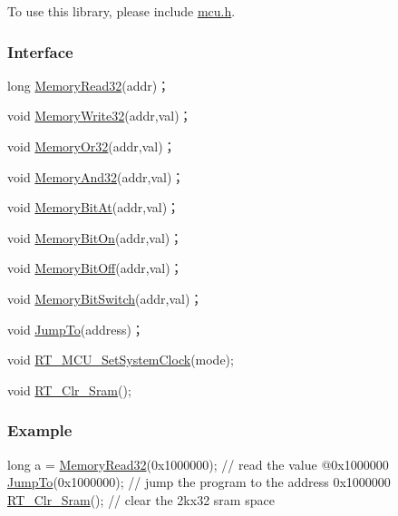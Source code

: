 To use this library, please include {\ttfamily \mbox{\hyperlink{a00020}{mcu.\+h}}}.

\subsubsection*{Interface}


\begin{DoxyCode}
\textcolor{keywordtype}{long} \mbox{\hyperlink{a00020_a2d484dc15bdf30ee11ab3b05f31f0e16}{MemoryRead32}}(addr)；

\textcolor{keywordtype}{void} \mbox{\hyperlink{a00020_a6b9732365b12e48ddb89fe1028b975b0}{MemoryWrite32}}(addr,val)；

\textcolor{keywordtype}{void} \mbox{\hyperlink{a00020_a27874a97deab7cecdde5ddecf466e31e}{MemoryOr32}}(addr,val)；

\textcolor{keywordtype}{void} \mbox{\hyperlink{a00020_ad87cedffcaadc51db22594fce55173d4}{MemoryAnd32}}(addr,val)；

\textcolor{keywordtype}{void} \mbox{\hyperlink{a00020_afc530c7e6b49b0ca97c1ad9dac1c4750}{MemoryBitAt}}(addr,val)；

\textcolor{keywordtype}{void} \mbox{\hyperlink{a00020_a99a602346038b54068758ef00c42d1b6}{MemoryBitOn}}(addr,val)；

\textcolor{keywordtype}{void} \mbox{\hyperlink{a00020_a04c34919a950117ae7da2dc5a235622b}{MemoryBitOff}}(addr,val)；

\textcolor{keywordtype}{void} \mbox{\hyperlink{a00020_ae49e41753dbce64185d380d307ade78d}{MemoryBitSwitch}}(addr,val)；

\textcolor{keywordtype}{void} \mbox{\hyperlink{a00020_a38c3a81fc94bff4cb6654061b7d21909}{JumpTo}}(address)；

\textcolor{keywordtype}{void} \mbox{\hyperlink{a00020_a017f8665ec51267680fc0e536db19c13}{RT\_MCU\_SetSystemClock}}(mode);

\textcolor{keywordtype}{void} \mbox{\hyperlink{a00020_a42674a2ca7d088e68de4e2aa81ec597c}{RT\_Clr\_Sram}}();
\end{DoxyCode}


\subsubsection*{Example}


\begin{DoxyCode}
\textcolor{keywordtype}{long} a = \mbox{\hyperlink{a00020_a2d484dc15bdf30ee11ab3b05f31f0e16}{MemoryRead32}}(0x1000000);      \textcolor{comment}{// read the value @0x1000000}
\mbox{\hyperlink{a00020_a38c3a81fc94bff4cb6654061b7d21909}{JumpTo}}(0x1000000);                     \textcolor{comment}{// jump the program to the address 0x1000000}
\mbox{\hyperlink{a00020_a42674a2ca7d088e68de4e2aa81ec597c}{RT\_Clr\_Sram}}();                         \textcolor{comment}{// clear the 2kx32 sram space}
\end{DoxyCode}
 